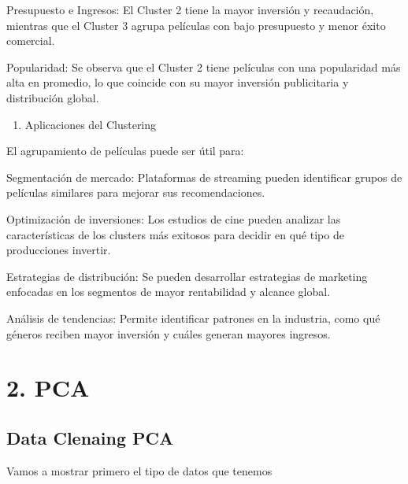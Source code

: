 \documentclass[
]{article}
\providecommand{\tightlist}{%
  \setlength{\itemsep}{0pt}\setlength{\parskip}{0pt}}
\begin{document}
Presupuesto e Ingresos: El Cluster 2 tiene la mayor inversión y
recaudación, mientras que el Cluster 3 agrupa películas con bajo
presupuesto y menor éxito comercial.

Popularidad: Se observa que el Cluster 2 tiene películas con una
popularidad más alta en promedio, lo que coincide con su mayor inversión
publicitaria y distribución global.

\begin{enumerate}
\def\labelenumi{\arabic{enumi}.}
\setcounter{enumi}{3}
\tightlist
\item
  Aplicaciones del Clustering
\end{enumerate}

El agrupamiento de películas puede ser útil para:

Segmentación de mercado: Plataformas de streaming pueden identificar
grupos de películas similares para mejorar sus recomendaciones.

Optimización de inversiones: Los estudios de cine pueden analizar las
características de los clusters más exitosos para decidir en qué tipo de
producciones invertir.

Estrategias de distribución: Se pueden desarrollar estrategias de
marketing enfocadas en los segmentos de mayor rentabilidad y alcance
global.

Análisis de tendencias: Permite identificar patrones en la industria,
como qué géneros reciben mayor inversión y cuáles generan mayores
ingresos.

\section{2. PCA}\label{pca}

\subsection{Data Clenaing PCA}\label{data-clenaing-pca}

Vamos a mostrar primero el tipo de datos que tenemos
\end{document}
